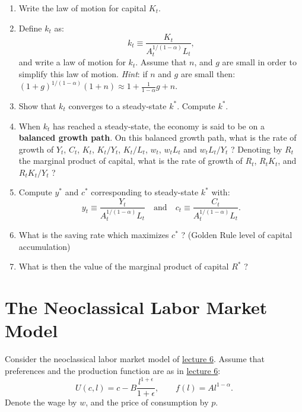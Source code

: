 \documentclass[]{book}
\theoremstyle{definition}
\theoremstyle{definition}
\theoremstyle{definition}
\theoremstyle{remark}
\begin{document}
\begin{enumerate}
\def\labelenumi{\arabic{enumi}.}
\item
  Write the law of motion for capital \(K_t\).
\item
  Define \(k_t\) as: \[ k_t\equiv\frac{K_t}{A_t^{1/(1-\alpha)} L_t},\]
  and write a law of motion for \(k_t\). Assume that \(n\), and \(g\)
  are small in order to simplify this law of motion. \emph{Hint}: if
  \(n\) and \(g\) are small then:
  \((1+g)^{1/(1-\alpha)}(1+n) \approx 1+\frac{1}{1-\alpha}g+n.\)
\item
  Show that \(k_t\) converges to a steady-state \(k^{*}\). Compute
  \(k^{*}\).
\item
  When \(k_t\) has reached a steady-state, the economy is said to be on
  a \textbf{balanced growth path}. On this balanced growth path, what is
  the rate of growth of \(Y_t\), \(C_t\), \(K_t\), \(K_t/Y_t\),
  \(K_t/L_t\), \(w_t\), \(w_t L_t\) and \(w_t L_t/Y_t\) ? Denoting by
  \(R_t\) the marginal product of capital, what is the rate of growth of
  \(R_t\), \(R_t K_t\), and \(R_t K_t/Y_t\) ?
\item
  Compute \(y^{*}\) and \(c^{*}\) corresponding to steady-state
  \(k^{*}\) with:
  \[y_t \equiv \frac{Y_t}{A_t^{1/(1-\alpha)} L_t} \quad \text{and} \quad c_t \equiv \frac{C_t}{A_t^{1/(1-\alpha)} L_t}.\]
\item
  What is the saving rate which maximizes \(c^{*}\) ? (Golden Rule level
  of capital accumulation)
\item
  What is then the value of the marginal product of capital \(R^{*}\) ?
\end{enumerate}

\section{The Neoclassical Labor Market
Model}\label{the-neoclassical-labor-market-model}

Consider the neoclassical labor market model of
\protect\hyperlink{labor-market}{lecture 6}. Assume that preferences and
the production function are as in
\protect\hyperlink{labor-market}{lecture 6}:
\[U(c, l)=c-B\frac{l^{1+\epsilon}}{1+\epsilon}, \qquad f(l)=Al^{1-\alpha}.\]
Denote the wage by \(w\), and the price of consumption by \(p\).
\end{document}
